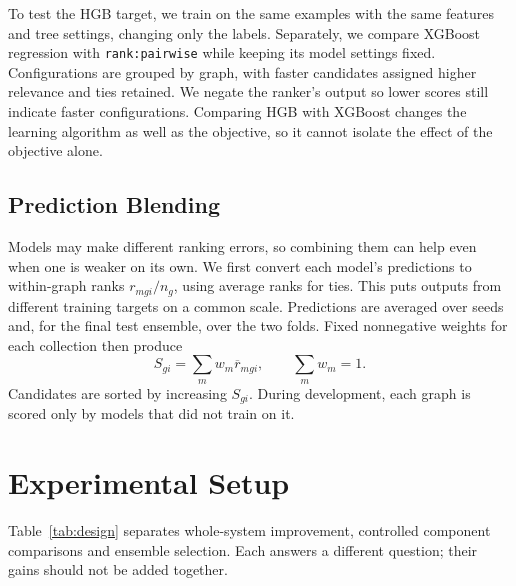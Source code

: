 \documentclass[letterpaper]{article}
\begin{document}
To test the HGB target, we train on the same examples with the same features and tree settings, changing only the labels. Separately, we compare XGBoost regression with \texttt{rank:pairwise} while keeping its model settings fixed. Configurations are grouped by graph, with faster candidates assigned higher relevance and ties retained. We negate the ranker's output so lower scores still indicate faster configurations. Comparing HGB with XGBoost changes the learning algorithm as well as the objective, so it cannot isolate the effect of the objective alone.

\subsection{Prediction Blending}
Models may make different ranking errors, so combining them can help even when one is weaker on its own. We first convert each model's predictions to within-graph ranks $r_{mgi}/n_g$, using average ranks for ties. This puts outputs from different training targets on a common scale. Predictions are averaged over seeds and, for the final test ensemble, over the two folds. Fixed nonnegative weights for each collection then produce
\begin{equation}
S_{gi}=\sum_m w_m\overline r_{mgi},\qquad \sum_mw_m=1.
\end{equation}
Candidates are sorted by increasing $S_{gi}$. During development, each graph is scored only by models that did not train on it.

\section{Experimental Setup}
Table~\ref{tab:design} separates whole-system improvement, controlled component comparisons and ensemble selection. Each answers a different question; their gains should not be added together.
\end{document}
